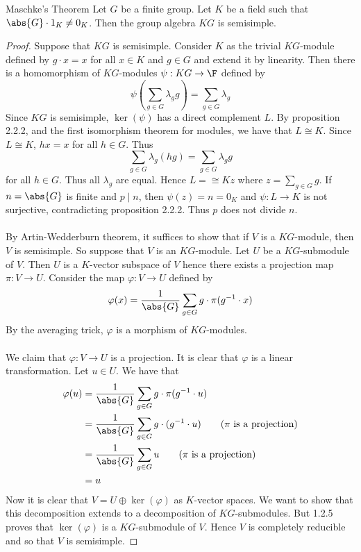 \documentclass[a4paper]{article}
\begin{document}
\begin{thm}{Maschke's Theorem}{} Let $G$ be a finite group. Let $K$ be a field such that $\abs{G}\cdot 1_K\neq 0_K$. Then the group algebra $KG$ is semisimple. \tcbline
\begin{proof}
Suppose that $KG$ is semisimple. Consider $K$ as the trivial $KG$-module defined by $g\cdot x=x$ for all $x\in K$ and $g\in G$ and extend it by linearity. Then there is a homomorphism of $KG$-modules $\psi:KG\to\F$ defined by $$\psi\left(\sum_{g\in G}\lambda_gg\right)=\sum_{g\in G}\lambda_g$$ Since $KG$ is semisimple, $\ker(\psi)$ has a direct complement $L$. By proposition 2.2.2, and the first isomorphism theorem for modules, we have that $L\cong K$. Since $L\cong K$, $hx=x$ for all $h\in G$. Thus $$\sum_{g\in G}\lambda_g(hg)=\sum_{g\in G}\lambda_gg$$ for all $h\in G$. Thus all $\lambda_g$ are equal. Hence $L=\cong Kz$ where $z=\sum_{g\in G}g$. If $n=\abs{G}$ is finite and $p\;|\;n$, then $\psi(z)=n=0_K$ and $\psi:L\to K$ is not surjective, contradicting proposition 2.2.2. Thus $p$ does not divide $n$. \\~\\

By Artin-Wedderburn theorem, it suffices to show that if $V$ is a $KG$-module, then $V$ is semisimple. So suppose that $V$ is an $KG$-module. Let $U$ be a $KG$-submodule of $V$. Then $U$ is a $K$-vector subspace of $V$ hence there exists a projection map $\pi:V\to U$. Consider the map $\varphi:V\to U$ defined by $$\varphi(x)=\frac{1}{\abs{G}}\sum_{g\in G}g\cdot\pi(g^{-1}\cdot x)$$ By the averaging trick, $\varphi$ is a morphism of $KG$-modules. \\~\\

We claim that $\varphi:V\to U$ is a projection. It is clear that $\varphi$ is a linear transformation. Let $u\in U$. We have that 
\begin{align*}
\varphi(u)&=\frac{1}{\abs{G}}\sum_{g\in G}g\cdot\pi(g^{-1}\cdot u)\\
&=\frac{1}{\abs{G}}\sum_{g\in G}g\cdot(g^{-1}\cdot u)\tag{$\pi$ is a projection}\\
&=\frac{1}{\abs{G}}\sum_{g\in G}u\tag{$\pi$ is a projection}\\
&=u
\end{align*}
Now it is clear that $V=U\oplus\ker(\varphi)$ as $K$-vector spaces. We want to show that this decomposition extends to a decomposition of $KG$-submodules. But 1.2.5 proves that $\ker(\varphi)$ is a $KG$-submodule of $V$. Hence $V$ is completely reducible and so that $V$ is semisimple. 
\end{proof}
\end{thm}
\end{document}
